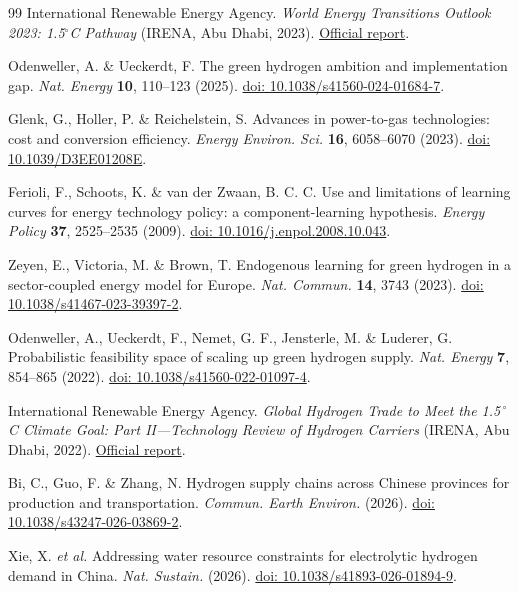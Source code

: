 \documentclass[11pt,a4paper]{article}
\begin{document}
\begin{thebibliography}{99}
International Renewable Energy Agency. \emph{World Energy Transitions Outlook 2023: 1.5$^{\circ}$C Pathway} (IRENA, Abu Dhabi, 2023). \href{https://www.irena.org/Publications/2023/Jun/World-Energy-Transitions-Outlook-2023}{Official report}.

Odenweller, A. \& Ueckerdt, F. The green hydrogen ambition and implementation gap. \emph{Nat. Energy} \textbf{10}, 110--123 (2025). \href{https://doi.org/10.1038/s41560-024-01684-7}{doi: 10.1038/s41560-024-01684-7}.

Glenk, G., Holler, P. \& Reichelstein, S. Advances in power-to-gas technologies: cost and conversion efficiency. \emph{Energy Environ. Sci.} \textbf{16}, 6058--6070 (2023). \href{https://doi.org/10.1039/D3EE01208E}{doi: 10.1039/D3EE01208E}.

Ferioli, F., Schoots, K. \& van der Zwaan, B. C. C. Use and limitations of learning curves for energy technology policy: a component-learning hypothesis. \emph{Energy Policy} \textbf{37}, 2525--2535 (2009). \href{https://doi.org/10.1016/j.enpol.2008.10.043}{doi: 10.1016/j.enpol.2008.10.043}.

Zeyen, E., Victoria, M. \& Brown, T. Endogenous learning for green hydrogen in a sector-coupled energy model for Europe. \emph{Nat. Commun.} \textbf{14}, 3743 (2023). \href{https://doi.org/10.1038/s41467-023-39397-2}{doi: 10.1038/s41467-023-39397-2}.

Odenweller, A., Ueckerdt, F., Nemet, G. F., Jensterle, M. \& Luderer, G. Probabilistic feasibility space of scaling up green hydrogen supply. \emph{Nat. Energy} \textbf{7}, 854--865 (2022). \href{https://doi.org/10.1038/s41560-022-01097-4}{doi: 10.1038/s41560-022-01097-4}.

International Renewable Energy Agency. \emph{Global Hydrogen Trade to Meet the 1.5\,$^\circ$C Climate Goal: Part II---Technology Review of Hydrogen Carriers} (IRENA, Abu Dhabi, 2022). \href{https://www.irena.org/publications/2022/Apr/Global-hydrogen-trade-Part-II}{Official report}.

Bi, C., Guo, F. \& Zhang, N. Hydrogen supply chains across Chinese provinces for production and transportation. \emph{Commun. Earth Environ.} (2026). \href{https://doi.org/10.1038/s43247-026-03869-2}{doi: 10.1038/s43247-026-03869-2}.

Xie, X. \emph{et al.} Addressing water resource constraints for electrolytic hydrogen demand in China. \emph{Nat. Sustain.} (2026). \href{https://doi.org/10.1038/s41893-026-01894-9}{doi: 10.1038/s41893-026-01894-9}.


\end{thebibliography}
\end{document}
